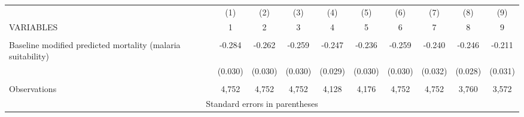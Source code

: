\documentclass[]{article}
\begin{document}
\begin{tabular}{lccccccccc} \hline
 & (1) & (2) & (3) & (4) & (5) & (6) & (7) & (8) & (9) \\
VARIABLES & 1 & 2 & 3 & 4 & 5 & 6 & 7 & 8 & 9 \\ \hline
 &  &  &  &  &  &  &  &  &  \\
Baseline modified predicted mortality (malaria suitability) & -0.284 & -0.262 & -0.259 & -0.247 & -0.236 & -0.259 & -0.240 & -0.246 & -0.211 \\
 & (0.030) & (0.030) & (0.030) & (0.029) & (0.030) & (0.030) & (0.032) & (0.028) & (0.031) \\
 &  &  &  &  &  &  &  &  &  \\
 Observations & 4,752 & 4,752 & 4,752 & 4,128 & 4,176 & 4,752 & 4,752 & 3,760 & 3,572 \\ \hline
\multicolumn{10}{c}{ Standard errors in parentheses} \\
\end{tabular}
\end{document}

